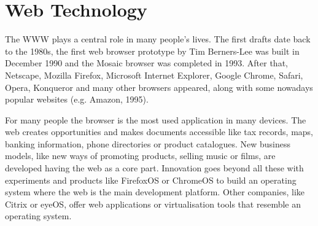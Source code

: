 





\section{Web Technology}
The \ac{WWW} plays a central role in many people's lives.
The first drafts date back to the 1980s, the first web browser prototype by Tim Berners-Lee was built in December 1990 and the Mosaic browser was completed in 1993.
After that, Netscape, Mozilla Firefox, Microsoft Internet Explorer, Google Chrome, Safari, Opera, Konqueror and many other browsers appeared, along with some nowadays popular websites (e.g. Amazon, 1995).

For many people the browser is the most used application in many devices. 
The web creates opportunities and makes documents accessible like tax records, maps, banking information, phone directories or product catalogues.
New business models, like new ways of promoting products, selling music or films, are developed having the web as a core part.
Innovation goes beyond all these with experiments and products like FirefoxOS or ChromeOS to build an operating system where the web is the main development platform.
Other companies, like Citrix or eyeOS, offer web applications or virtualisation tools that resemble an operating system. %


